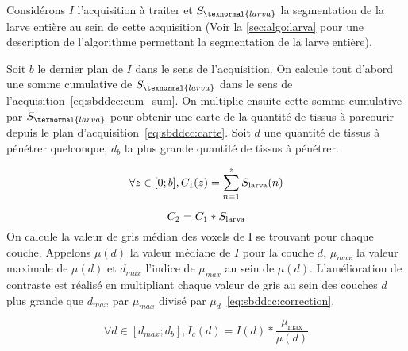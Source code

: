 \documentclass[\main/main.tex]{subfiles}
\begin{document}
%
Considérons $I$ l'acquisition à traiter et $S_{\texnormal{larva}}$ la segmentation de la larve entière au sein de cette acquisition (Voir la \autoref{sec:algo:larva} pour une description de l'algorithme permettant la segmentation de la larve entière).

%
Soit $b$ le dernier plan de $I$ dans le sens de l'acquisition.
%
On calcule tout d'abord une somme cumulative de $S_{\texnormal{larva}}$ dans le sens de l'acquisition~\eqref{eq:sbddcc:cum_sum}.
%
On multiplie ensuite cette somme cumulative par $S_{\texnormal{larva}}$ pour obtenir une carte de la quantité de tissus à parcourir depuis le plan d'acquisition~\eqref{eq:sbddcc:carte}.
%
Soit $d$ une quantité de tissus à pénétrer quelconque, $d_b$ la plus grande quantité de tissus à pénétrer.

\begin{equation}
    \label{eq:sbddcc:cum_sum}
    \forall z \in [0;b], 
        C_1(z)=\sum_{n=1}^{z}S_{\textnormal{larva}}(n)
\end{equation}

\begin{equation}
    \label{eq:sbddcc:carte}
    C_2=C_1 * S_{\textnormal{larva}}
\end{equation}
%
On calcule la valeur de gris médian des voxels de I se trouvant pour chaque couche.
%
Appelons $\mu{}(d)$ la valeur médiane de $I$ pour la couche $d$, $\mu_{max}$ la valeur maximale de $\mu{}(d)$ et $d_{max}$ l'indice de $\mu_{max}$ au sein de $\mu{}(d)$.
%
L'amélioration de contraste est réalisé en multipliant chaque valeur de gris au sein des couches $d$ plus grande que $d_{max}$ par $\mu_{max}$ divisé par $\mu_d$~\eqref{eq:sbddcc:correction}.

\begin{equation}
    \label{eq:sbddcc:correction}
    \forall d \in [d_{max};d_b],
        I_{c}(d)=I(d)*\frac{\mu_{\max}}{\mu(d)}
\end{equation}
\end{document}
